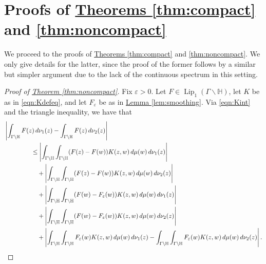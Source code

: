 \documentclass[11pt,a4paper]{amsart}
\newcommand{\e}{\varepsilon}
\newcommand{\Hb}{\mathbb{H}}
\DeclareMathOperator{\Lip}{Lip}
\numberwithin{equation}{section}
\theoremstyle{remark}
\theoremstyle{definition}
\begin{document}
\section{Proofs of \texorpdfstring{\hyperref[thm:compact]{Theorems \ref*{thm:compact}} and \ref{thm:noncompact}}{Theorems \ref{thm:compact} and \ref{thm:noncompact}}}

We proceed to the proofs of \hyperref[thm:compact]{Theorems \ref*{thm:compact}} and \ref{thm:noncompact}. We only give details for the latter, since the proof of the former follows by a similar but simpler argument due to the lack of the continuous spectrum in this setting.

\begin{proof}[Proof of {\hyperref[thm:noncompact]{Theorem \ref*{thm:noncompact}}}]
Fix $\e > 0$. Let $F \in \Lip_1(\Gamma \backslash \Hb)$, let $K$ be as in \eqref{eqn:Kdefeq}, and let $F_{\e}$ be as in \hyperref[lem:smoothing]{Lemma \ref*{lem:smoothing}}. Via \eqref{eqn:Kint} and the triangle inequality, we have that
\begin{equation}
\label{eqn:triangleinequality}
\begin{split}
\hspace{1.5cm} & \hspace{-1.5cm} \left|\int_{\Gamma \backslash \Hb} F(z) \, d\nu_1(z) - \int_{\Gamma \backslash \Hb} F(z) \, d\nu_2(z)\right|	\\
& \leq \left|\int_{\Gamma \backslash \Hb} \int_{\Gamma \backslash \Hb} (F(z) - F(w)) K(z,w) \, d\mu(w) \, d\nu_1(z)\right|	\\
& \quad + \left|\int_{\Gamma \backslash \Hb} \int_{\Gamma \backslash \Hb} (F(z) - F(w)) K(z,w) \, d\mu(w) \, d\nu_2(z)\right|	\\
& \quad + \left|\int_{\Gamma \backslash \Hb} \int_{\Gamma \backslash \Hb} (F(w) - F_{\e}(w)) K(z,w) \, d\mu(w) \, d\nu_1(z)\right|	\\
& \quad + \left|\int_{\Gamma \backslash \Hb} \int_{\Gamma \backslash \Hb} (F(w) - F_{\e}(w)) K(z,w) \, d\mu(w) \, d\nu_2(z)\right|	\\
& \quad + \left|\int_{\Gamma \backslash \Hb} \int_{\Gamma \backslash \Hb} F_{\e}(w) K(z,w) \, d\mu(w) \, d\nu_1(z) - \int_{\Gamma \backslash \Hb} \int_{\Gamma \backslash \Hb} F_{\e}(w) K(z,w) \, d\mu(w) \, d\nu_2(z)\right|.
\end{split}
\end{equation}


\end{proof}
\end{document}
